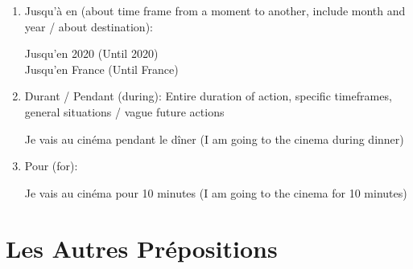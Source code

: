 \documentclass{book}
\begin{document}
\begin{enumerate}
                \begin{center}
                    Jusqu'à où est la plage? (How far is the beach?)
                \end{center}
            \item Jusqu'à en (about time frame from a moment to another, include month and year / about destination):
                \begin{center}
                    Jusqu'en 2020 (Until 2020) \\
                    Jusqu'en France (Until France)
                \end{center}
            \item Durant / Pendant (during): Entire duration of action, specific timeframes, general situations / vague future actions
                \begin{center}
                    Je vais au cinéma pendant le dîner (I am going to the cinema during dinner)
                \end{center}
            \item Pour (for):
                \begin{center}
                    Je vais au cinéma pour 10 minutes (I am going to the cinema for 10 minutes)
                \end{center}
        \end{enumerate}
    
    \section{Les Autres Prépositions}
\end{document}
